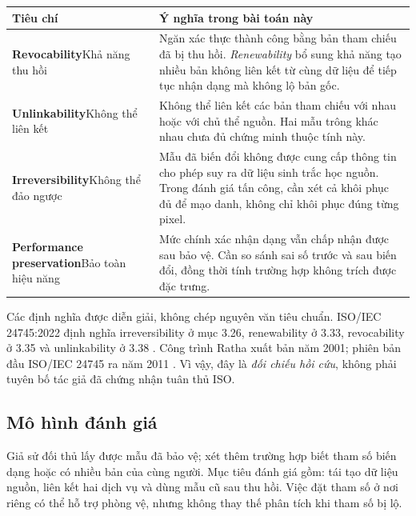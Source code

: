 \documentclass[11pt,a4paper]{article}
\begin{document}
\begin{tabularx}{\linewidth}{@{}p{.27\linewidth}Y@{}}
\toprule
Tiêu chí & Ý nghĩa trong bài toán này \\
\midrule
\textbf{Revocability}\newline Khả năng thu hồi & Ngăn xác thực thành công bằng bản tham chiếu đã bị thu hồi. \emph{Renewability} bổ sung khả năng tạo nhiều bản không liên kết từ cùng dữ liệu để tiếp tục nhận dạng mà không lộ bản gốc. \\
\textbf{Unlinkability}\newline Không thể liên kết & Không thể liên kết các bản tham chiếu với nhau hoặc với chủ thể nguồn. Hai mẫu trông khác nhau chưa đủ chứng minh thuộc tính này. \\
\textbf{Irreversibility}\newline Không thể đảo ngược & Mẫu đã biến đổi không được cung cấp thông tin cho phép suy ra dữ liệu sinh trắc học nguồn. Trong đánh giá tấn công, cần xét cả khôi phục đủ để mạo danh, không chỉ khôi phục đúng từng pixel. \\
\textbf{Performance preservation}\newline Bảo toàn hiệu năng & Mức chính xác nhận dạng vẫn chấp nhận được sau bảo vệ. Cần so sánh sai số trước và sau biến đổi, đồng thời tính trường hợp không trích được đặc trưng. \\
\bottomrule
\end{tabularx}

Các định nghĩa được diễn giải, không chép nguyên văn tiêu chuẩn. ISO/IEC 24745:2022 định nghĩa irreversibility ở mục 3.26, renewability ở 3.33, revocability ở 3.35 và unlinkability ở 3.38 \cite{isopreview}. Công trình Ratha xuất bản năm 2001; phiên bản đầu ISO/IEC 24745 ra năm 2011 \cite{iso2011}. Vì vậy, đây là \emph{đối chiếu hồi cứu}, không phải tuyên bố tác giả đã chứng nhận tuân thủ ISO.

\subsection{Mô hình đánh giá}
Giả sử đối thủ lấy được mẫu đã bảo vệ; xét thêm trường hợp biết tham số biến dạng hoặc có nhiều bản của cùng người. Mục tiêu đánh giá gồm: tái tạo dữ liệu nguồn, liên kết hai dịch vụ và dùng mẫu cũ sau thu hồi. Việc đặt tham số ở nơi riêng có thể hỗ trợ phòng vệ, nhưng không thay thế phân tích khi tham số bị lộ.
\end{document}
